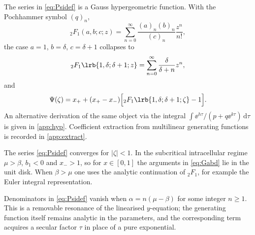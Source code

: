 The series in \cref{eq:Psidef} is a Gauss hypergeometric function. With the Pochhammer symbol \((q)_n\),
\begin{equation}
\label{eq:2F1def}
{}_2F_1(a,b;c;z) = \sum^\infty_{n=0}\frac{(a)_n(b)_n}{(c)_n}\frac{z^n}{n!},
\end{equation}
the case \(a=1\), \(b=\delta\), \(c=\delta+1\) collapses to
\begin{equation}
\label{eq:2F1simple}
{}_2F_1\lrb{1,\delta;\delta+1;z} = \sum_{n=0}^{\infty}\frac{\delta}{\delta+n}z^n ,
\end{equation}
and
\begin{equation}
\label{eq:Psihyp}
\Psi(\zeta) = x_+ + (x_+-x_-)\Bigl[{}_2F_1\lrb{1,\delta;\delta+1;\zeta} - 1\Bigr].
\end{equation}
An alternative derivation of the same object via the integral \(\int\ee^{h\tau}/(p+q\ee^{k\tau})\,\mathrm{d}\tau\) is given in \cref{app:hyp}. Coefficient extraction from multilinear generating functions is recorded in \cref{app:extract}.

\begin{remark}
\label{rem:domain}
The series \cref{eq:Psidef} converges for \(|\zeta|<1\). In the subcritical intracellular regime \(\mu>\beta\), \(b_1<0\) and \(x_->1\), so for \(x\in[0,1]\) the arguments in \cref{eq:Gabd} lie in the unit disk. When \(\beta>\mu\) one uses the analytic continuation of \({}_2F_1\), for example the Euler integral representation.
\end{remark}

\begin{remark}[Resonance]
\label{rem:resonance}
Denominators in \cref{eq:Psidef} vanish when \(\alpha=n(\mu-\beta)\) for some integer \(n\ge1\). This is a removable resonance of the linearised \(y\)-equation; the generating function itself remains analytic in the parameters, and the corresponding term acquires a secular factor \(\tau\) in place of a pure exponential.
\end{remark}

\FloatBarrier
